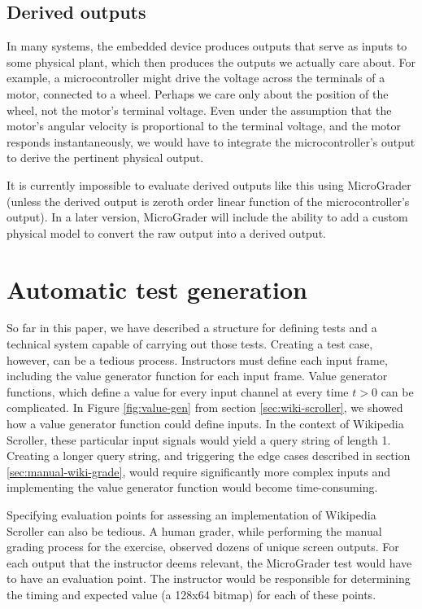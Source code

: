\documentclass[12pt]{article}
\begin{document}
\subsection{Derived outputs}
\label{sec:derived-outputs}
In many systems, the embedded device produces outputs that serve as inputs to some physical plant, which then produces the outputs we actually care about.  For example, a microcontroller might drive the voltage across the terminals of a motor, connected to a wheel.  Perhaps we care only about the position of the wheel, not the motor's terminal voltage.  Even under the assumption that the motor's angular velocity is proportional to the terminal voltage, and the motor responds instantaneously, we would have to integrate the microcontroller's output to derive the pertinent physical output.

It is currently impossible to evaluate derived outputs like this using MicroGrader (unless the derived output is zeroth order linear function of the microcontroller's output).  In a later version, MicroGrader will include the ability to add a custom physical model to convert the raw output into a derived output.

\newpage
\section{Automatic test generation}
So far in this paper, we have described a structure for defining tests and a technical system capable of carrying out those tests.  Creating a test case, however, can be a tedious process.  Instructors must define each input frame, including the value generator function for each input frame.  Value generator functions, which define a value for every input channel at every time $t>0$ can be complicated.  In Figure \ref{fig:value-gen} from section \ref{sec:wiki-scroller}, we showed how a value generator function could define inputs.  In the context of Wikipedia Scroller, these particular input signals would yield a query string of length 1.  Creating a longer query string, and triggering the edge cases described in section \ref{sec:manual-wiki-grade}, would require significantly more complex inputs and implementing the value generator function would become time-consuming.

Specifying evaluation points for assessing an implementation of Wikipedia Scroller can also be tedious.  A human grader, while performing the manual grading process for the exercise, observed dozens of unique screen outputs.  For each output that the instructor deems relevant, the MicroGrader test would have to have an evaluation point.  The instructor would be responsible for determining the timing and expected value (a 128x64 bitmap) for each of these points.
\end{document}
